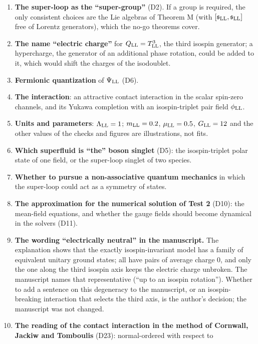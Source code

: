 \documentclass[
  10pt,
]{article}
\begin{document}
\begin{enumerate}
\def\labelenumi{\arabic{enumi}.}
\item
  \textbf{The super-loop as the ``super-group''} (D2). If a group is
  required, the only consistent choices are the Lie algebras of Theorem
  M (with \([\mathfrak s_{\rm LL},\mathfrak s_{\rm LL}]\) free of
  Lorentz generators), which the no-go theorems cover.
\item
  \textbf{The name ``electric charge''} for \(Q_{\rm LL}=T^3_{\rm LL}\),
  the third isospin generator; a hypercharge, the generator of an
  additional phase rotation, could be added to it, which would shift the
  charges of the isodoublet.
\item
  \textbf{Fermionic quantization} of \(\Psi_{\rm LL}\) (D6).
\item
  \textbf{The interaction}: an attractive contact interaction in the
  scalar spin-zero channels, and its Yukawa completion with an
  isospin-triplet pair field \(\phi_{\rm LL}\).
\item
  \textbf{Units and parameters}: \(\Lambda_{\rm LL}=1\);
  \(m_{\rm LL}=0.2\), \(\mu_{\rm LL}=0.5\), \(G_{\rm LL}=12\) and the
  other values of the checks and figures are illustrations, not fits.
\item
  \textbf{Which superfluid is ``the'' boson singlet} (D5): the
  isospin-triplet polar state of one field, or the super-loop singlet of
  two species.
\item
  \textbf{Whether to pursue a non-associative quantum mechanics} in
  which the super-loop could act as a symmetry of states.
\item
  \textbf{The approximation for the numerical solution of Test 2} (D10):
  the mean-field equations, and whether the gauge fields should become
  dynamical in the solvers (D11).
\item
  \textbf{The wording ``electrically neutral'' in the manuscript.} The
  explanation shows that the exactly isospin-invariant model has a
  family of equivalent unitary ground states; all have pairs of average
  charge 0, and only the one along the third isospin axis keeps the
  electric charge unbroken. The manuscript names that representative
  (``up to an isospin rotation''). Whether to add a sentence on this
  degeneracy to the manuscript, or an isospin-breaking interaction that
  selects the third axis, is the author's decision; the manuscript was
  not changed.
\item
  \textbf{The reading of the contact interaction in the method of
  Cornwall, Jackiw and Tomboulis} (D23): normal-ordered with respect to

\end{enumerate}
\end{document}
